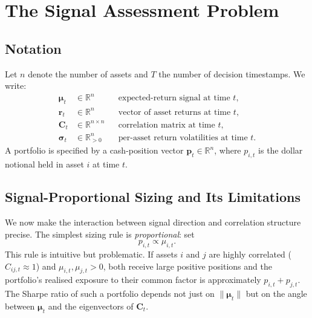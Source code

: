 \documentclass[11pt,a4paper]{article}
\newcommand{\C}{\mathbf{C}}
\newcommand{\muvec}{\bm{\mu}}
\newcommand{\R}{\mathbb{R}}
\begin{document}
\section{The Signal Assessment Problem}
\label{sec:problem}

\subsection{Notation}

Let $n$ denote the number of assets and $T$ the number of decision timestamps.
We write:
\begin{align}
  \muvec_t &\in \R^n && \text{expected-return signal at time } t, \\
  \mathbf{r}_t &\in \R^n && \text{vector of asset returns at time } t, \\
  \C_t &\in \R^{n\times n} && \text{correlation matrix at time } t, \\
  \bm{\sigma}_t &\in \R^n_{>0} && \text{per-asset return volatilities at time }t.
\end{align}
A portfolio is specified by a cash-position vector
$\mathbf{p}_t \in \R^n$, where $p_{i,t}$ is the dollar notional held in
asset $i$ at time $t$.

\subsection{Signal-Proportional Sizing and Its Limitations}
\label{sec:proportional}

We now make the interaction between signal direction and correlation structure
precise.  The simplest sizing rule is \emph{proportional}: set
\begin{equation}
  \label{eq:proportional}
  p_{i,t} \propto \mu_{i,t}.
\end{equation}
This rule is intuitive but problematic.  If assets $i$ and $j$ are highly
correlated ($C_{ij,t} \approx 1$) and $\mu_{i,t}, \mu_{j,t} > 0$, both
receive large positive positions and the portfolio's realised exposure to their
common factor is approximately $p_{i,t} + p_{j,t}$.  The Sharpe ratio of such
a portfolio depends not just on $\|\muvec_t\|$ but on the angle between
$\muvec_t$ and the eigenvectors of $\C_t$.
\end{document}
